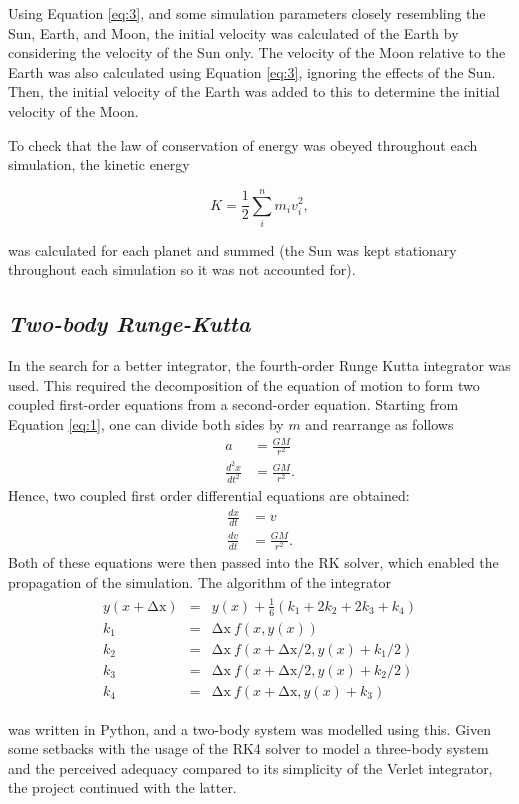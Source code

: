 \documentclass[12pt, english]{report}
\begin{document}
\normalsize{Using Equation \ref{eq:3}, and some simulation parameters closely resembling the Sun, Earth, and Moon, the initial velocity was calculated of the Earth by considering the velocity of the Sun only. The velocity of the Moon relative to the Earth was also calculated using Equation \ref{eq:3}, ignoring the effects of the Sun. Then, the initial velocity of the Earth was added to this to determine the initial velocity of the Moon.

To check that the law of conservation of energy \cite{noauthor_feynman_nodate} was obeyed throughout each simulation, the kinetic energy \cite{noauthor_210_2018}

\begin{equation}
    K = \frac{1}{2} \sum^n_i m_i v_i^2,
\end{equation}
}
was calculated for each planet and summed (the Sun was kept stationary throughout each simulation so it was not accounted for). 

\subsection{\textsl{Two-body Runge-Kutta}}
\normalsize{\noindent In the search for a better integrator, the fourth-order Runge Kutta integrator was used. This required the decomposition of the equation of motion to form two coupled first-order equations from a second-order equation. Starting from Equation \ref{eq:1}, one can divide both sides by $m$ and rearrange as follows
\begin{align}
    a &= \frac{GM}{r^2} \\
    \frac{d^2x}{dt^2} &= \frac{GM}{r^2}.
\end{align}
Hence, two coupled first order differential equations are obtained:
\begin{align}
    \frac{dx}{dt} &= v \\
    \frac{dv}{dt} &= \frac{GM}{r^2}.
\end{align}
Both of these equations were then passed into the RK solver, which enabled the propagation of the simulation. The algorithm of the integrator \cite{bowler_phas0030_nodate}
\begin{align}
\begin{matrix} 
y(x+\mathrm{\Delta x})&=&y(x)+\frac{1}{6}\left(k_1+2k_2+2k_3+k_4\right)\\k_1&=&\mathrm{\Delta x}\ f(x,y(x))\\k_2&=&\mathrm{\Delta x}\ f(x+\mathrm{\Delta x}/2,y(x)+k_1/2)\\k_3&=&\mathrm{\Delta x}\ f(x+\mathrm{\Delta x}/2,y(x)+k_2/2)\\k_4&=&\mathrm{\Delta x}\ f(x+\mathrm{\Delta x},y(x)+k_3) \end{matrix}
\end{align}

was written in Python, and a two-body system was modelled using this. Given some setbacks with the usage of the RK4 solver to model a three-body system and the perceived adequacy compared to its simplicity of the Verlet integrator, the project continued with the latter.}
\end{document}
